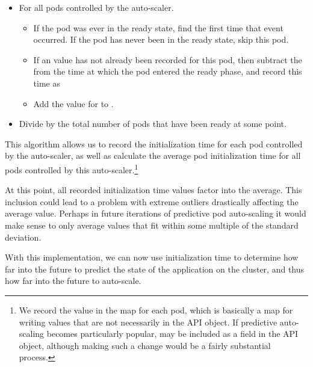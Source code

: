 \begin{itemize}
  \item For all pods controlled by the auto-scaler.
    \begin{itemize}
      \item If the pod was ever in the ready state, find the first time that
        event occurred. If the pod has never been in the ready state, skip this pod.
      \item If an  value has not already been recorded for
        this pod, then subtract the  from the time at which the
        pod entered the ready phase, and record this time as
      \item Add the value for  to
        .
      \end{itemize}
    \item Divide  by the total number of pods that
      have been ready at some point.
\end{itemize}

This algorithm allows us to record the initialization time for each pod
controlled by the auto-scaler, as well as calculate the average pod
initialization time for all pods controlled by this auto-scaler.\footnote{We
record the value in the  map for each pod,
which is basically a map for writing
values that are not necessarily in the  API object. If predictive
auto-scaling becomes particularly popular,  may be
included as a field in the  API object, although making such a change would
be a fairly substantial process.}

At this point, all recorded initialization time values factor into the average.
This inclusion could lead to a problem with extreme outliers drastically
affecting the average value. Perhaps in future iterations of predictive pod
auto-scaling it would make sense to only average values that fit within some
multiple of the standard deviation.

With this implementation, we can now use initialization time to determine how
far into the future to predict the state of the application on the cluster, and
thus how far into the future to auto-scale.
